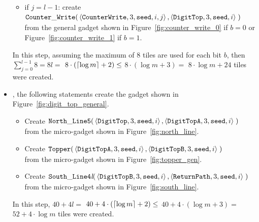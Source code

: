 \begin{itemize}
\begin{itemize}
        \item if $j = l-1$: create
        $\begin{aligned}[t]
            \cwrite(&\left\langle {\tt CounterWrite}, 3, {\tt seed}, i, j \right\rangle, \left\langle {\tt DigitTop}, 3, {\tt seed}, i \right\rangle \;)
        \end{aligned}$\\from the general gadget shown in Figure~\ref{fig:counter_write_0} if $b = 0$ or Figure~\ref{fig:counter_write_1} if $b = 1$.
    \end{itemize}
    In this step, assuming the maximum of 8 tiles are used for each bit $b$, then
    $\sum^{l-1}_{j=0} 8 = 8l =$
    $8 \cdot \left( \ceil*{\log m} + 2 \right) \leq$
    $8 \cdot \left( {\log m} + 3 \right) =$
    $8 \cdot {\log m} + 24$ tiles were created.

    \item {\dtop}, the following statements create the gadget shown in Figure~\ref{fig:digit_top_general}.
    \begin{itemize}
        \item Create
        $\begin{aligned}[t]
            {\tt North\_Line5}(&\left\langle {\tt DigitTop},  3, {\tt seed}, i \right\rangle,
                                \left\langle {\tt DigitTopA}, 3, {\tt seed}, i \right\rangle \;)
        \end{aligned}$\\from the micro-gadget shown in Figure~\ref{fig:north_line}.

        \item Create
        $\begin{aligned}[t]
            {\tt Topper}(&\left\langle {\tt DigitTopA}, 3, {\tt seed}, i \right\rangle,
                          \left\langle {\tt DigitTopB}, 3, {\tt seed}, i \right\rangle \;)
        \end{aligned}$\\from the micro-gadget shown in Figure~\ref{fig:topper_gen}.

        \item Create
        $\begin{aligned}[t]
            {\tt South\_Line4\textit{l}}(&\left\langle {\tt DigitTopB},  3, {\tt seed}, i \right\rangle,
                                          \left\langle {\tt ReturnPath}, 3, {\tt seed}, i \right\rangle \;)
        \end{aligned}$\\from the micro-gadget shown in Figure~\ref{fig:south_line}.
    \end{itemize}
    In this step, $40 + 4l =$
    $40 + 4 \cdot \left( \ceil*{\log m} + 2 \right) \leq$
    $40 + 4 \cdot \left( {\log m} + 3 \right) =$
    $52 + 4 \cdot {\log m}$ tiles were created.


\end{itemize}
